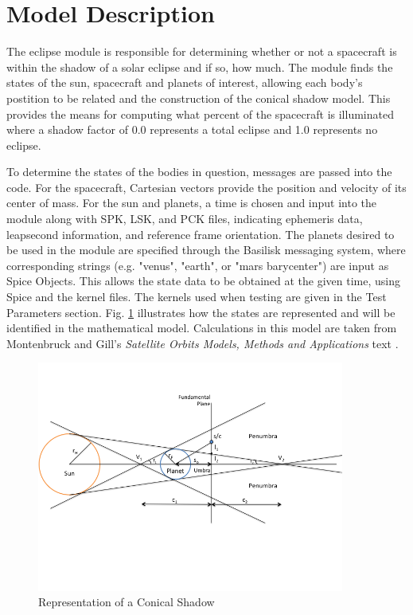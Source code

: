 \section{Model Description}

The eclipse module is responsible for determining whether or not a spacecraft is within the shadow of a solar eclipse and if so, how much. The module finds the states of the sun, spacecraft and planets of interest, allowing each body's postition to be related and the construction of the conical shadow model. This provides the means for computing what percent of the spacecraft is illuminated where a shadow factor of 0.0 represents a total eclipse and 1.0 represents no eclipse.

To determine the states of the bodies in question, messages are passed into the code. For the spacecraft, Cartesian vectors provide the position and velocity of its center of mass. For the sun and planets, a time is chosen and input into the module along with SPK, LSK, and PCK files, indicating ephemeris data, leapsecond information, and reference frame orientation. The planets desired to be used in the module are specified through the Basilisk messaging system, where corresponding strings (e.g. "venus", "earth", or "mars barycenter") are input as Spice Objects. This allows the state data to be obtained at the given time, using Spice and the kernel files. The kernels used when testing are given in the Test Parameters section. Fig. \ref{fig:ConShad} illustrates how the states are represented and will be identified in the mathematical model. Calculations in this model are taken from Montenbruck and Gill's \textit{Satellite Orbits Models, Methods and Applications} text \cite{bib:1}.
\begin{figure}[ht]
	\centering
	\captionsetup{justification=centering}
	\includegraphics[width=0.9\textwidth]{Figures/conical_shadow.png}
	\caption{Representation of a Conical Shadow}\label{fig:ConShad}
\end{figure} 
